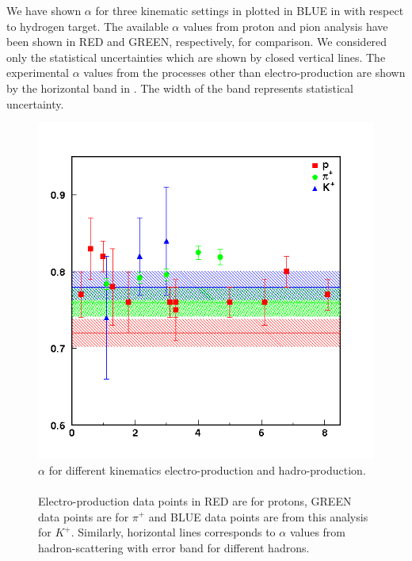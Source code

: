 We have shown $\alpha$ for three kinematic settings in  plotted in BLUE in  with respect to hydrogen target. The available $\alpha$ values from proton and pion analysis have been shown in RED and GREEN, respectively, for comparison. We considered only the statistical uncertainties which are shown by closed vertical lines. The experimental $\alpha$ values from the processes other than electro-production are shown by the horizontal band in . The width of the band represents statistical uncertainty.

\begin{figure}[!tbp]
  \centering
  \includegraphics[trim = 8mm 8mm 8mm 8mm, clip,width=0.8\columnwidth]{alpha}
  \caption[$\alpha$ for different kinematics electro-production and hadro-production.]{\label{fig:alpha}$\alpha$ for different kinematics electro-production and hadro-production.\\\\ Electro-production data points in RED are for protons, GREEN data points are for $\pi^+$ and BLUE data points are from this analysis for $K^+$. Similarly, horizontal lines corresponds to $\alpha$ values from hadron-scattering with error band for different hadrons.}
\end{figure}
